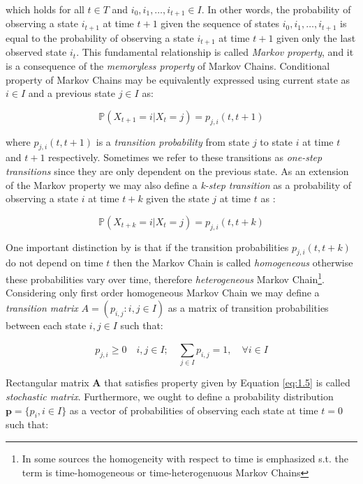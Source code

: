 which holds for all $t \in T$ and $i_0,i_1,\ldots,i_{t+1} \in I$. \cite{Praskova2012} In other words, the probability of observing a state $i_{t+1}$ at time $t+1$ given the sequence of states $i_0,i_1,\ldots,i_{t+1}$ is equal to the probability of observing a state $i_{t+1}$ at time $t+1$ given only the last observed state $i_t$.
This fundamental relationship is called {\it Markov property}, and it is a consequence of the \textit{memoryless property} of Markov Chains. \cite{Haggstrom2002}
Conditional property of Markov Chains may be equivalently expressed using current state as $i \in I$ and a previous state $j \in I$ as:

\begin{equation}
    \mathbb{P}(X_{t+1}=i|X_t=j) = p_{j,i}(t,t+1)
\end{equation}

where $p_{j,i}(t,t+1)$ is a {\it transition probability} from state $j$ to state $i$ at time $t$ and $t+1$ respectively. Sometimes we refer to these transitions as {\it one-step transitions} since they are only dependent on the previous state.
As an extension of the Markov property we may also define a \textit{k-step transition} as a probability of observing a state $i$ at time $t+k$ given the state $j$ at time $t$ as \cite{Tolver2016}:

\begin{equation}
    \mathbb{P}(X_{t+k}=i|X_t=j) = p_{j,i}(t,t+k)
\end{equation}

One important distinction by \cite{Weinan2019} is that if the transition probabilities $p_{j,i}(t,t+k)$ do not depend on time $t$ then the Markov Chain is called \textit{homogeneous} otherwise these probabilities vary over time, therefore \textit{heterogeneous} Markov Chain\footnote{In some sources the homogeneity with respect to time is emphasized s.t. the term is time-homogeneous or time-heterogenuous Markov Chains}.
Considering only first order homogeneous Markov Chain we may define a \textit{transition matrix} 
$A = (p_{i,j} : i,j \in I)$ as a matrix of transition probabilities between each state $i,j \in I$ such that:

\begin{equation} \label{eq:1.5}
p_{j,i} \geq 0 \quad i,j \in I; \quad \sum\limits_{j \in I} ^{}p_{i,j} = 1, \quad \forall i \in I
\end{equation}

Rectangular matrix $\textbf{A}$ that satisfies property given by Equation \ref{eq:1.5} is called \textit{stochastic matrix}. \cite{Gagniuc2017}
Furthermore, we ought to define a probability distribution $\textbf{p} =\{p_i, i \in I\} $ as a vector of probabilities of observing each state at time $t=0$ such that:

